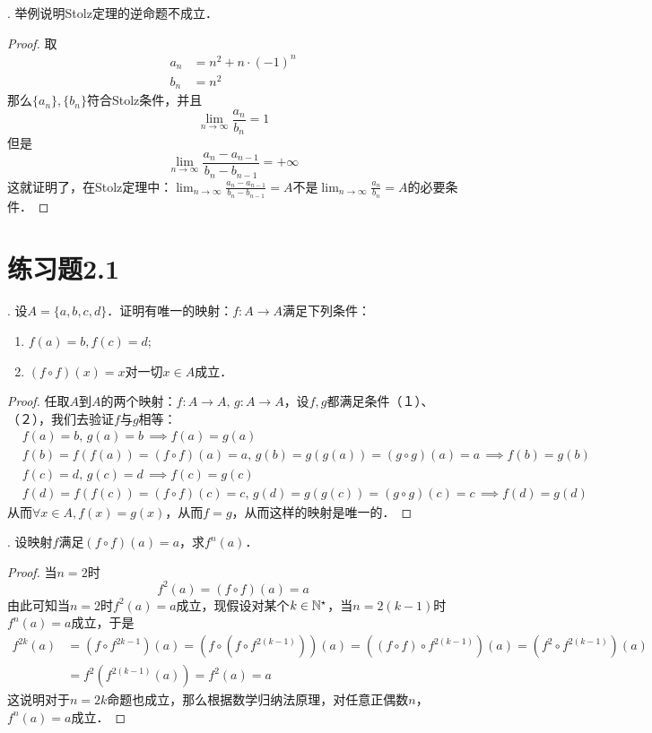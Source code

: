 . 举例说明Stolz定理的逆命题不成立．

\begin{proof}
取
\begin{align}
    a_n &= n^2 + n \cdot (-1)^n \\
    b_n &= n^2
\end{align}
那么$\{ a_n \}, \{ b_n \}$符合Stolz条件，并且
\begin{equation}
    \lim_{n \to \infty} \frac{a_n}{b_n} = 1
\end{equation}
但是
\begin{equation}
    \lim_{n \to \infty} \frac{a_{n} - a_{n-1}}{b_{n} - b_{n-1}} = +\infty
\end{equation}
这就证明了，在Stolz定理中：$\displaystyle\lim_{n \to \infty} \frac{a_n - a_{n-1}}{b_n - b_{n-1}} = A$不是$\displaystyle\lim_{n \to \infty} \frac{a_n}{b_n} = A$的必要条件．
\end{proof}

\section*{练习题2.1}
. 设$A = \{ a, b, c, d \}$．证明有唯一的映射：$f: A \to A$满足下列条件：
\begin{enumerate}
    \item $f(a) = b, f(c) = d$;
    \item $( f \circ f ) (x) = x$对一切$x \in A$成立．
\end{enumerate}

\begin{proof}
任取$A$到$A$的两个映射：$f: A \to A, \, g: A \to A$，设$f, g$都满足条件（１）、（２），我们去验证$f$与$g$相等：
\begin{align}
    &f(a) = b, \, g(a) = b \, \implies f(a) = g(a) \\
    &f(b) = f(f(a)) = (f \circ f)(a) = a, \, g(b) = g(g(a)) = (g \circ g)(a) = a \, \implies f(b) = g(b) \\
    &f(c) = d, \, g(c) = d \, \implies f(c) = g(c) \\
    &f(d) = f(f(c)) = (f \circ f)(c) = c, \, g(d) = g(g(c)) = (g \circ g)(c) = c \, \implies f(d) = g(d)
\end{align}
从而$\forall x \in A, f(x) = g(x)$，从而$f = g$，从而这样的映射是唯一的．
\end{proof}

. 设映射$f$满足$(f \circ f)(a) = a$，求$f^n (a)$．
\begin{proof}
当$n=2$时
\begin{equation}
    f^2 (a) = (f \circ f)(a) = a
\end{equation}
由此可知当$n=2$时$f^2 (a) = a$成立，现假设对某个$k \in \mathbb{N}^\star$，当$n = 2(k-1)$时$f^n (a) = a$成立，于是
\begin{align}
f^{2k} (a) &= (f \circ f^{2k-1}) (a) = (f \circ (f \circ f^{2(k-1)}))(a) = ((f \circ f) \circ f^{2(k-1)})(a) = (f^2 \circ f^{2(k-1)})(a) \\
&= f^2 (f^{2(k-1)}(a)) = f^2 (a) = a
\end{align}
这说明对于$n = 2k$命题也成立，那么根据数学归纳法原理，对任意正偶数$n$，$f^n (a) = a$成立．
\end{proof}


